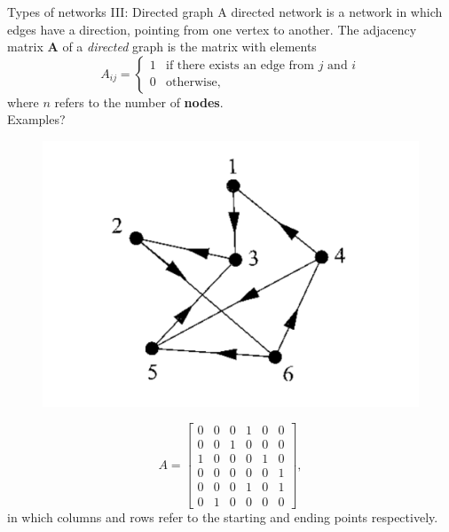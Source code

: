 \documentclass[10pt]{beamer}
\begin{document}
\begin{frame}{Types of networks III: Directed graph}
A directed network is a network in which edges have a direction, pointing from one vertex to another. The adjacency matrix \textbf{A} of a \textit{directed} graph is the matrix with elements
	\begin{equation}
	A_{ij} =
	\begin{cases}
	1 & \text{if there exists an edge from $j$ and $i$}\\
	0 & \text{otherwise},
	\end{cases}
	\end{equation}
where $n$ refers to the number of \textbf{nodes}.\\

\vspace{1cm}
Examples?
\end{frame}

\begin{frame}
	\begin{figure}
	\centering
	\includegraphics[scale=0.2]{Figs/dig}
	\end{figure}
	\vspace{0.2cm}
	\begin{equation}
	A =
	\begin{bmatrix}
	0 & 0 & 0 & 1 & 0 & 0 \\
	0 & 0 & 1 & 0 & 0 & 0 \\
	1 & 0 & 0 & 0 & 1 & 0 \\
	0 & 0 & 0 & 0 & 0 & 1 \\
	0 & 0 & 0 & 1 & 0 & 1 \\
	0 & 1 & 0 & 0 & 0 & 0		
	\end{bmatrix},
	\end{equation}
 in which columns and rows refer to the starting and ending points respectively. 
\end{frame}
\end{document}
